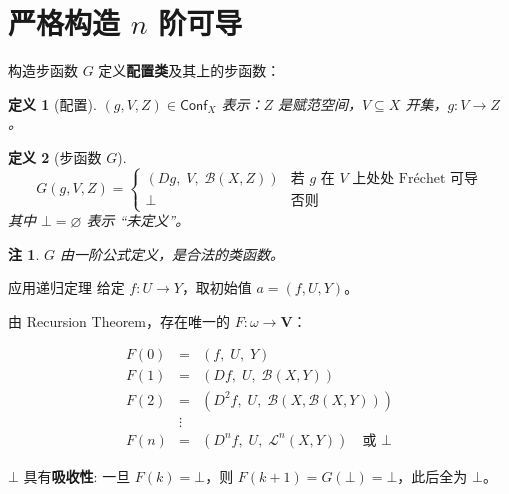 \documentclass[10pt,aspectratio=169]{beamer}
\newtheorem{dfn}{定义}[section]
\newtheorem{rmk}{注}[section]
\newcommand{\calL}{\mathcal{L}}
\newcommand{\calB}{\mathcal{B}}
\newcommand{\VV}{\mathbf{V}}
\begin{document}
\section{严格构造 $n$ 阶可导}

\begin{frame}{构造步函数 $G$}
  定义\textbf{配置类}及其上的步函数：

  \medskip
  \begin{dfn}[配置]
    $(g, V, Z) \in \mathsf{Conf}_X$ 表示：$Z$ 是赋范空间，$V \subseteq X$ 开集，$g: V \to Z$。
  \end{dfn}

  \begin{dfn}[步函数 $G$]
    \[
      G(g, V, Z) = \begin{cases}
        (Dg,\; V,\; \calB(X, Z)) & \text{若 } g \text{ 在 } V \text{ 上处处 Fréchet 可导} \\
        \bot & \text{否则}
      \end{cases}
    \]
    其中 $\bot = \varnothing$ 表示 ``未定义''。
  \end{dfn}

  \begin{rmk}
    $G$ 由一阶公式定义，是合法的类函数。
  \end{rmk}
\end{frame}

\begin{frame}{应用递归定理}
  给定 $f: U \to Y$，取初始值 $a = (f, U, Y)$。

  \medskip
  由 Recursion Theorem，存在唯一的 $F: \omega \to \VV$：

  \[
    \begin{array}{rcl}
      F(0) &=& (f,\; U,\; Y) \\[4pt]
      F(1) &=& (Df,\; U,\; \calB(X,Y)) \\[4pt]
      F(2) &=& (D^2f,\; U,\; \calB(X, \calB(X,Y))) \\[4pt]
      &\vdots& \\
      F(n) &=& (D^n f,\; U,\; \calL^n(X,Y)) \quad \text{或 } \bot
    \end{array}
  \]

  \medskip
  $\bot$ 具有\textbf{吸收性}: 一旦 $F(k) = \bot$，则 $F(k+1) = G(\bot) = \bot$，此后全为 $\bot$。
\end{frame}
\end{document}
